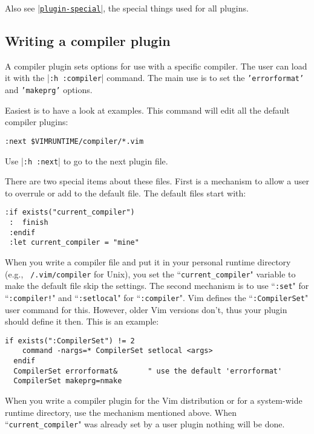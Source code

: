 Also see \hyperref[plugin-special]{|\texttt{plugin-special}|}, the special things used for all plugins.
\subsection{Writing a compiler plugin}
\label{write-compiler-plugin}
A compiler plugin sets options for use with a specific compiler.
The user can load it with the |\texttt{:h :compiler}| command.
The main use is to set the \texttt{'errorformat'} and \texttt{'makeprg'} options.

Easiest is to have a look at examples.
This command will edit all the default compiler plugins:

\begin{Verbatim}[samepage=true]
 :next $VIMRUNTIME/compiler/*.vim
\end{Verbatim}

Use |\texttt{:h :next}| to go to the next plugin file.

There are two special items about these files.
First is a mechanism to allow a user to overrule or add to the default file.
The default files start with:

\begin{Verbatim}[samepage=true]
 :if exists("current_compiler")
 :  finish
 :endif
 :let current_compiler = "mine"
\end{Verbatim}

When you write a compiler file and put it in your personal runtime directory (e.g., \texttt{~/.vim/compiler} for Unix), you set the ``\texttt{current\_compiler}" variable to make the default file skip the settings.
\label{:CompilerSet}
The second mechanism is to use ``\texttt{:set}" for ``\texttt{:compiler!}" and ``\texttt{:setlocal}" for ``\texttt{:compiler}".
Vim defines the ``\texttt{:CompilerSet}" user command for this.
However, older Vim versions don't, thus your plugin should define it then.
This is an example:

\begin{Verbatim}[samepage=true]
  if exists(":CompilerSet") != 2
    command -nargs=* CompilerSet setlocal <args>
  endif
  CompilerSet errorformat&       " use the default 'errorformat'
  CompilerSet makeprg=nmake
\end{Verbatim}

When you write a compiler plugin for the Vim distribution or for a system-wide runtime directory, use the mechanism mentioned above.
When ``\texttt{current\_compiler}" was already set by a user plugin nothing will be done.

